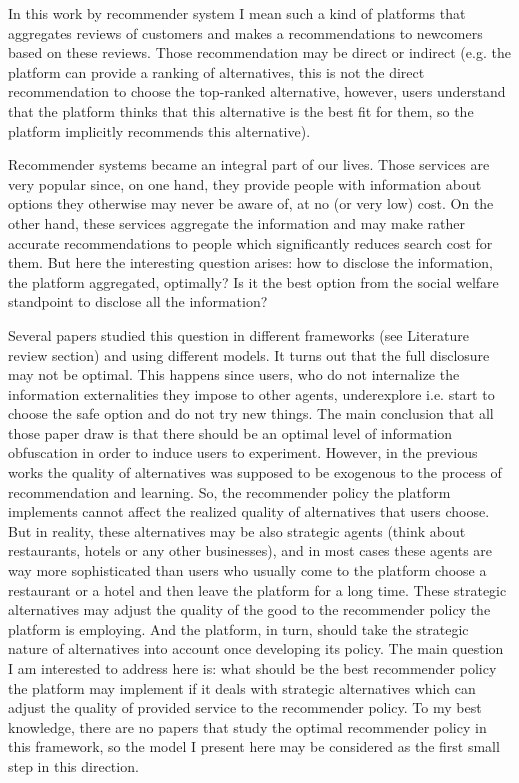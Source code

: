 \documentclass[a4paper]{article}
\begin{document}
	 
	 
	 
	 In this work by recommender system I mean such a kind of platforms that aggregates reviews of customers and makes a recommendations to newcomers based on these reviews. Those recommendation may be direct or indirect (e.g. the platform can provide a ranking of alternatives, this is not the direct recommendation to choose the top-ranked alternative, however, users understand that the platform thinks that this alternative is the best fit for them, so the platform implicitly recommends this alternative).
	 
	 
	 
	 
	 
	Recommender systems became an integral part of our lives. Those services are very popular since, on one hand, they provide people with information about options they otherwise may never be aware of, at no (or very low) cost. On the other hand, these services aggregate the information and may make rather accurate recommendations to people which significantly reduces search cost for them. But here the interesting question arises: how to disclose the information, the platform aggregated, optimally? Is it the best option from the social welfare standpoint to disclose all the information? 
		
	
	Several papers studied this question in different frameworks (see Literature review section) and using different models. It turns out that the full disclosure may not be optimal. This happens since users, who do not internalize the information externalities they impose to other agents, underexplore i.e. start to choose the safe option and do not try new things. The main conclusion that all those paper draw is that there should be an optimal level of information obfuscation in order to induce users to experiment. However, in the previous works the quality of alternatives was supposed to be exogenous to the process of recommendation and learning. So, the recommender policy the platform implements cannot affect the realized quality of alternatives that users choose. But in reality, these alternatives may be also strategic agents (think about restaurants, hotels or any other businesses), and in most cases these agents are way more sophisticated than users who usually come to the platform choose a restaurant or a hotel and then leave the platform for a long time. These strategic alternatives may adjust the quality of the good to the recommender policy the platform is employing. And the platform, in turn, should take the strategic nature of alternatives into account once developing its policy. The main question I am interested to address here is: what should be the best recommender policy the platform may implement if it deals with strategic alternatives which can adjust the quality of provided service to the recommender policy. To my best knowledge, there are no papers that study the optimal recommender policy in this framework, so the model I present here may be considered as the first small step in this direction.
	
\end{document}
